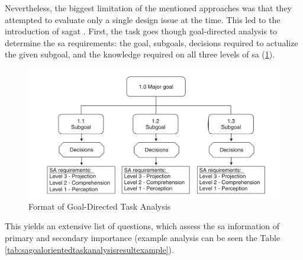 Nevertheless, the biggest limitation of the mentioned approaches was that they attempted to evaluate only a single design issue at the time. This led \parencite{endsley_situation_1988} to the introduction of \gls{sagat} . First, the task goes though goal-directed analysis to determine the \gls{sa} requirements: the goal, subgoals, decisions required to actualize the given subgoal, and the knowledge required on all three levels of \gls{sa} (\ref{fig:sagoalorientedtaskanalysis}).
\begin{figure}
	\centering
	\includegraphics[width=0.7\linewidth]{figures/placeholders/SA_goal_oriented_task_analysis}
	\caption{Format of Goal-Directed Task Analysis \parencite{endsley_direct_nodate}}
	\label{fig:sagoalorientedtaskanalysis}
\end{figure}
This yields an extensive list of questions, which assess the \gls{sa} information of primary and secondary importance (example analysis can be seen the Table \ref{tab:sagoalorientedtaskanalysisresultexample}).
